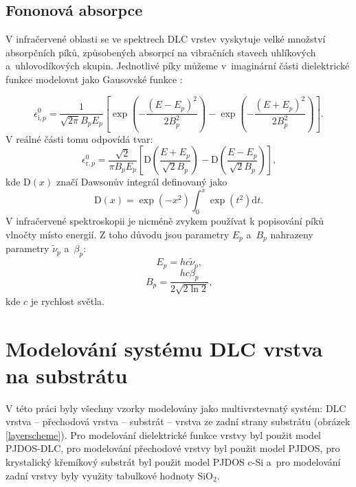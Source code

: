 \subsection{Fononová absorpce}
V infračervené oblasti se ve spektrech DLC vrstev vyskytuje velké množství absorpčních píků, způsobených absorpcí na vibračních stavech uhlíkových a~uhlovodíkových skupin. Jednotlivé píky můžeme v~imaginární části dielektrické funkce modelovat jako Gausovské funkce \cite{Franta2007}:

\begin{equation}
\label{gaus}
\epsilon^0_{\mathrm{i},p} = \frac{1}{\sqrt{2 \pi} B_p E_p} \left[ \exp\left(-\frac{(E-E_p)^2}{2B_p^2}\right) - \exp\left(-\frac{(E+E_p)^2}{2B_p^2}\right) \right] \text{.}
\end{equation}
V reálné části tomu odpovídá tvar:
\begin{equation}
\epsilon^0_{\mathrm{r},p} = \frac{\sqrt{2}}{\pi B_p E_p} \left[ \mathrm{D}\left(\frac{E+E_p}{\sqrt{2}B_p}\right) -\mathrm{D}\left(\frac{E-E_p}{\sqrt{2}B_p}\right) \right] \text{,}
\end{equation}
kde $\mathrm{D}(x)$ značí Dawsonův integrál definovaný jako
\begin{equation}
\mathrm{D}(x) = \exp(-x^2)\int_0^x \exp(t^2) \mathrm{d}t \text{.}
\end{equation}
V infračervené spektroskopii je nicméně zvykem používat k popisování píků vlnočty místo energií. Z toho důvodu jsou parametry $E_p$ a~$B_p$ nahrazeny parametry $\tilde{\nu}_p$ a~$\beta_p$:
\begin{equation}
E_p = h c \tilde{\nu}_p \text{,}
\end{equation}
\begin{equation}
B_p = \frac{h c \beta_p}{2 \sqrt{2 \ln 2}} \text{,}
\end{equation}
kde $c$ je rychlost světla. 




\section{Modelování systému DLC vrstva na substrátu}
V této práci byly všechny vzorky modelovány jako multivrstevnatý systém: DLC vrstva -- přechodová vrstva -- substrát -- vrstva ze zadní strany substrátu (obrázek \ref{layerscheme}). Pro mo\-de\-lování dielektrické funkce vrstvy byl použit model PJDOS-DLC, pro modelování přechodové vrstvy byl použit model PJDOS, pro krystalický křemíkový substrát byl použit model PJDOS c-Si a~pro modelování zadní vrstvy byly využity tabulkové hodnoty SiO$_2$.

